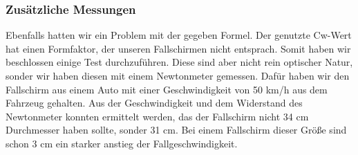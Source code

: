 \subsubsection{Zusätzliche Messungen}
Ebenfalls hatten wir ein Problem mit der gegeben Formel. Der genutzte Cw-Wert hat einen Formfaktor, der unseren Fallschirmen nicht entsprach. Somit haben wir beschlossen einige Test durchzuführen. Diese sind aber nicht rein optischer Natur, sonder wir haben diesen mit einem Newtonmeter gemessen. Dafür haben wir den Fallschirm aus einem Auto mit einer Geschwindigkeit von 50 km/h aus dem Fahrzeug gehalten. Aus der Geschwindigkeit und dem Widerstand des Newtonmeter konnten ermittelt werden, das der Fallschirm nicht 34 cm Durchmesser haben sollte, sonder 31 cm. Bei einem Fallschirm dieser Größe sind schon 3 cm ein starker anstieg der Fallgeschwindigkeit.